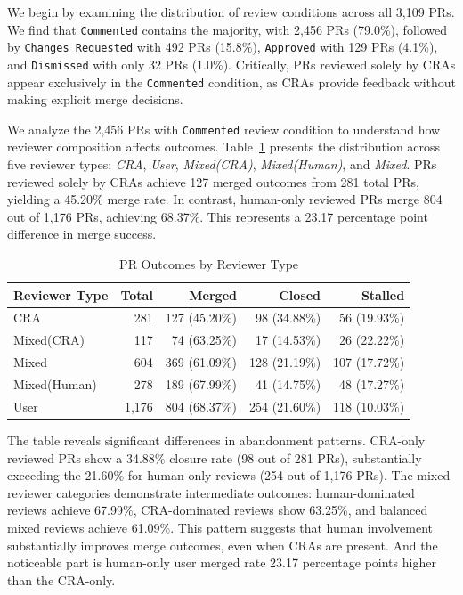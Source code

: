 \documentclass[sigconf]{acmart}
\begin{document}
We begin by examining the distribution of review conditions across all 3,109 PRs. We find that \texttt{Commented} contains the majority, with 2,456 PRs (79.0\%), followed by \texttt{Changes Requested} with 492 PRs (15.8\%), \texttt{Approved} with 129 PRs (4.1\%), and \texttt{Dismissed} with only 32 PRs (1.0\%). Critically, PRs reviewed solely by CRAs appear exclusively in the \texttt{Commented} condition, as CRAs provide feedback without making explicit merge decisions.

We analyze the 2,456 PRs with \texttt{Commented} review condition to understand how reviewer composition affects outcomes. Table~\ref{tab:commented_outcomes} presents the distribution across five reviewer types: \textit{CRA}, \textit{User}, \textit{Mixed(CRA)}, \textit{Mixed(Human)}, and \textit{Mixed}. PRs reviewed solely by CRAs achieve 127 merged outcomes from 281 total PRs, yielding a 45.20\% merge rate. In contrast, human-only reviewed PRs merge 804 out of 1,176 PRs, achieving 68.37\%. This represents a 23.17 percentage point difference in merge success.

\begin{table}[h]
\centering
\small
\caption{PR Outcomes by Reviewer Type}
\label{tab:commented_outcomes}
\begin{tabular}{lrrrr}
\hline
\textbf{Reviewer Type} & \textbf{Total} & \textbf{Merged} & \textbf{Closed} & \textbf{Stalled} \\
\hline
CRA & 281 & 127 (45.20\%) & 98 (34.88\%) & 56 (19.93\%) \\
Mixed(CRA) & 117 & 74 (63.25\%) & 17 (14.53\%) & 26 (22.22\%) \\
Mixed & 604 & 369 (61.09\%) & 128 (21.19\%) & 107 (17.72\%) \\
Mixed(Human) & 278 & 189 (67.99\%) & 41 (14.75\%) & 48 (17.27\%) \\
User & 1,176 & 804 (68.37\%) & 254 (21.60\%) & 118 (10.03\%) \\
\hline
\end{tabular}
\end{table}

The table reveals significant differences in abandonment patterns. CRA-only reviewed PRs show a 34.88\% closure rate (98 out of 281 PRs), substantially exceeding the 21.60\% for human-only reviews (254 out of 1,176 PRs). The mixed reviewer categories demonstrate intermediate outcomes: human-dominated reviews achieve 67.99\%, CRA-dominated reviews show 63.25\%, and balanced mixed reviews achieve 61.09\%. This pattern suggests that human involvement substantially improves merge outcomes, even when CRAs are present. And the noticeable part is human-only user merged rate 23.17 percentage points higher than the CRA-only.
\end{document}
